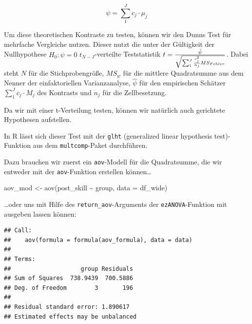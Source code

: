 \documentclass[
]{book}
\newenvironment{Shaded}{\begin{snugshade}}{\end{snugshade}}
\newcommand{\AttributeTok}[1]{\textcolor[rgb]{0.77,0.63,0.00}{#1}}
\newcommand{\FunctionTok}[1]{\textcolor[rgb]{0.00,0.00,0.00}{#1}}
\newcommand{\NormalTok}[1]{#1}
\newcommand{\OtherTok}[1]{\textcolor[rgb]{0.56,0.35,0.01}{#1}}
\newcommand{\SpecialCharTok}[1]{\textcolor[rgb]{0.00,0.00,0.00}{#1}}
\begin{document}
\[\psi = \sum_1^Jc_j\cdot\mu_j\]

Um diese theoretischen Kontraste zu testen, können wir den Dunns Test für mehrfache Vergleiche nutzen. Dieser nutzt die unter der Gültigkeit der Nullhypothese \(H_0: \psi = 0\) \(t_{N-J}\)-verteilte Teststatistik \(t = {{\hat\psi}\over{\sqrt{\sum_1^J {c^2_j\over{n_j}}MS_{Fehler}}}}\). Dabei steht \(N\) für die Stichprobengröße, \(MS_{w}\) für die mittlere Quadratsumme aus dem Nenner der einfaktoriellen Varianzanalyse, \(\hat\psi\) für den empirischen Schätzer \(\sum_1^Jc_j\cdot M_j\) des Kontrasts und \(n_j\) für die Zellbesetzung.

Da wir mit einer t-Verteilung testen, können wir natürlich auch gerichtete Hypothesen aufstellen.

In R lässt sich dieser Test mit der \texttt{glht} (generalized linear hypothesis test)-Funktion aus dem \texttt{multcomp}-Paket durchführen.

Dazu brauchen wir zuerst ein \texttt{aov}-Modell für die Quadratsumme, die wir entweder mit der \texttt{aov}-Funktion erstellen können\ldots{}

\begin{Shaded}
\begin{Highlighting}[]
\NormalTok{aov\_mod }\OtherTok{\textless{}{-}} \FunctionTok{aov}\NormalTok{(post\_skill }\SpecialCharTok{\textasciitilde{}}\NormalTok{ group, }\AttributeTok{data =}\NormalTok{ df\_wide)}
\end{Highlighting}
\end{Shaded}

\ldots oder uns mit Hilfe des \texttt{return\_aov}-Arguments der \texttt{ezANOVA}-Funktion mit ausgeben lassen können:

\begin{Shaded}
\end{Shaded}

\begin{verbatim}
## Call:
##    aov(formula = formula(aov_formula), data = data)
## 
## Terms:
##                    group Residuals
## Sum of Squares  738.9439  700.5886
## Deg. of Freedom        3       196
## 
## Residual standard error: 1.890617
## Estimated effects may be unbalanced
\end{verbatim}
\end{document}
